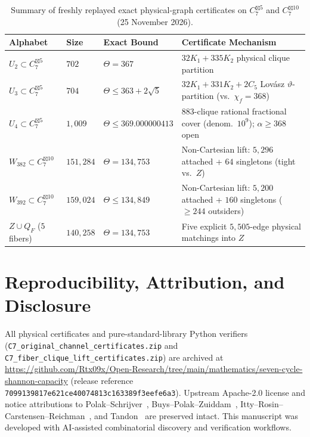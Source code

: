 \documentclass[11pt,letterpaper]{article}
\theoremstyle{definition}
\theoremstyle{remark}
\newcommand{\ThetaCap}{\Theta}
\newcommand{\varthetaL}{\vartheta}
\begin{document}
\begin{table}[!htbp]
\centering
\caption{Summary of freshly replayed exact physical-graph certificates on $C_7^{\boxtimes 5}$ and $C_7^{\boxtimes 10}$ (25 November 2026).}
\label{tab:c7-summary}
\small
\begin{tabularx}{\linewidth}{@{}l l l X@{}}
\toprule
\textbf{Alphabet} & \textbf{Size} & \textbf{Exact Bound} & \textbf{Certificate Mechanism} \\
\midrule
$U_2 \subset C_7^{\boxtimes 5}$ & $702$ & $\ThetaCap = 367$ & $32K_1 + 335K_2$ physical clique partition \\
$U_3 \subset C_7^{\boxtimes 5}$ & $704$ & $\ThetaCap \le 363+2\sqrt{5}$ & $32K_1 + 331K_2 + 2C_5$ Lov\'asz $\varthetaL$-partition (vs.\ $\chi_f = 368$) \\
$U_4 \subset C_7^{\boxtimes 5}$ & $1{,}009$ & $\ThetaCap \le 369.000000413$ & $883$-clique rational fractional cover (denom.\ $10^9$); $\alpha \ge 368$ open \\
$W_{382} \subset C_7^{\boxtimes 10}$ & $151{,}284$ & $\ThetaCap = 134{,}753$ & Non-Cartesian lift: $5{,}296$ attached + $64$ singletons (tight vs.\ $Z$) \\
$W_{392} \subset C_7^{\boxtimes 10}$ & $159{,}024$ & $\ThetaCap \le 134{,}849$ & Non-Cartesian lift: $5{,}200$ attached + $160$ singletons ($\ge 244$ outsiders) \\
$Z \cup Q_F$ ($5$ fibers) & $140{,}258$ & $\ThetaCap = 134{,}753$ & Five explicit $5{,}505$-edge physical matchings into $Z$ \\
\bottomrule
\end{tabularx}
\end{table}

\section{Reproducibility, Attribution, and Disclosure}
All physical certificates and pure-standard-library Python verifiers (\nolinkurl{C7_original_channel_certificates.zip} and \nolinkurl{C7_fiber_clique_lift_certificates.zip}) are archived at \url{https://github.com/Rtx09x/Open-Research/tree/main/mathematics/seven-cycle-shannon-capacity} (release reference \texttt{7099139817e621ce40074813c163389f3eefe6a3}). Upstream Apache-2.0 license and notice attributions to Polak--Schrijver~\cite{PolakSchrijver2019}, Buys--Polak--Zuiddam~\cite{BPZ2026}, Itty--Rosin--Carstensen--Reichman~\cite{IRCR2026}, and Tandon~\cite{Tandon2026} are preserved intact. This manuscript was developed with AI-assisted combinatorial discovery and verification workflows.



\end{document}
